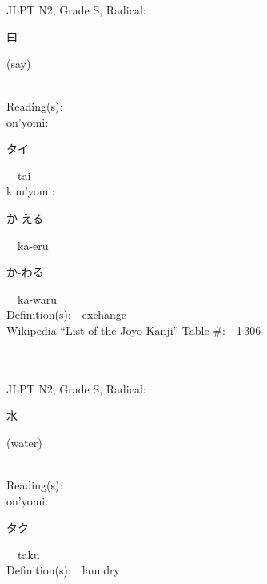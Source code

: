 \begin{multicols}{2}
{\fontsize{34pt}{40pt}  }\ \ \\  %
{JLPT N2, Grade S, Radical:\ \ {\begin{CJK}{UTF8}{min} 曰 \end{CJK}} (say) } \\
Reading(s):\ \ \\
{\hspace*{1em}}on'yomi:\ \ \\
{\hspace*{2em}}{\begin{CJK}{UTF8}{min} タイ \end{CJK}}\ \ tai\ \ \\
{\hspace*{1em}}kun'yomi:\ \ \\
{\hspace*{2em}}{\begin{CJK}{UTF8}{min} か-える \end{CJK}}\ \ ka-eru\ \ \\
{\hspace*{2em}}{\begin{CJK}{UTF8}{min} か-わる \end{CJK}}\ \ ka-waru\ \ \\
Definition(s):\ \ exchange \\
Wikipedia ``List of the J\=oy\=o Kanji'' Table \#:\ \ 1\,306 \\
\ \ \\
{\fontsize{34pt}{40pt}  }\ \ \\  %
{JLPT N2, Grade S, Radical:\ \ {\begin{CJK}{UTF8}{min} 水 \end{CJK}} (water) } \\
Reading(s):\ \ \\
{\hspace*{1em}}on'yomi:\ \ \\
{\hspace*{2em}}{\begin{CJK}{UTF8}{min} タク \end{CJK}}\ \ taku\ \ \\
Definition(s):\ \ laundry \\

\end{multicols}
